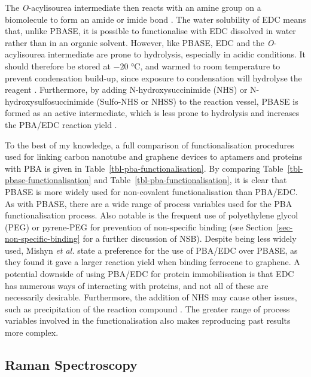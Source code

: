 \documentclass[
  a4paper,
]{scrbook}
\begin{document}
\begin{landscape}
\begin{center}
\end{center}
\end{landscape}
\restoregeometry %

The \emph{O}-acylisourea intermediate then reacts with an amine group on
a biomolecule to form an amide or imide bond
\autocite{Sehgal1994,Hermanson2013-4}. The water solubility of EDC means
that, unlike PBASE, it is possible to functionalise with EDC dissolved
in water rather than in an organic solvent. However, like PBASE, EDC and
the \emph{O}-acylisourea intermediate are prone to hydrolysis,
especially in acidic conditions. It should therefore be stored at
\(-20\) °C, and warmed to room temperature to prevent condensation
build-up, since exposure to condensation will hydrolyse the reagent
\autocite{Hermanson2013-4}. Furthermore, by adding N-hydroxysuccinimide
(NHS) or N-hydroxysulfosuccinimide (Sulfo-NHS or NHSS) to the reaction
vessel, PBASE is formed as an active intermediate, which is less prone
to hydrolysis and increases the PBA/EDC reaction yield
\autocite{Sehgal1994,Hermanson2013-4,Hermanson2013-14}.

To the best of my knowledge, a full comparison of functionalisation
procedures used for linking carbon nanotube and graphene devices to
aptamers and proteins with PBA is given in
Table~\ref{tbl-pba-functionalisation}. By comparing
Table~\ref{tbl-pbase-functionalisation} and
Table~\ref{tbl-pba-functionalisation}, it is clear that PBASE is more
widely used for non-covalent functionalisation than PBA/EDC. As with
PBASE, there are a wide range of process variables used for the PBA
functionalisation process. Also notable is the frequent use of
polyethylene glycol (PEG) or pyrene-PEG for prevention of non-specific
binding (see Section~\ref{sec-non-specific-binding} for a further
discussion of NSB). Despite being less widely used, Mishyn \emph{et al.}
\autocite{Mishyn2022} state a preference for the use of PBA/EDC over
PBASE, as they found it gave a larger reaction yield when binding
ferrocene to graphene. A potential downside of using PBA/EDC for protein
immobilisation is that EDC has numerous ways of interacting with
proteins, and not all of these are necessarily desirable. Furthermore,
the addition of NHS may cause other issues, such as precipitation of the
reaction compound \autocite{Hermanson2013-4}. The greater range of
process variables involved in the functionalisation also makes
reproducing past results more complex.

\hypertarget{raman-spectroscopy}{%
\subsection{Raman Spectroscopy}\label{raman-spectroscopy}}
\end{document}

